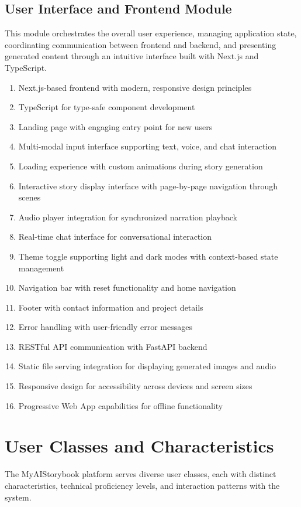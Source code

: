 \subsection{User Interface and Frontend Module}
This module orchestrates the overall user experience, managing application state, coordinating communication between frontend and backend, and presenting generated content through an intuitive interface built with Next.js \cite{nextjs2024} and TypeScript.
\begin{enumerate}
    \item Next.js-based frontend with modern, responsive design principles
    \item TypeScript for type-safe component development
    \item Landing page with engaging entry point for new users
    \item Multi-modal input interface supporting text, voice, and chat interaction
    \item Loading experience with custom animations during story generation
    \item Interactive story display interface with page-by-page navigation through scenes
    \item Audio player integration for synchronized narration playback
    \item Real-time chat interface for conversational interaction
    \item Theme toggle supporting light and dark modes with context-based state management
    \item Navigation bar with reset functionality and home navigation
    \item Footer with contact information and project details
    \item Error handling with user-friendly error messages
    \item RESTful API communication with FastAPI backend
    \item Static file serving integration for displaying generated images and audio
    \item Responsive design for accessibility across devices and screen sizes
    \item Progressive Web App capabilities for offline functionality
\end{enumerate}

\section{User Classes and Characteristics}
The MyAIStorybook platform serves diverse user classes, each with distinct characteristics, technical proficiency levels, and interaction patterns with the system.

